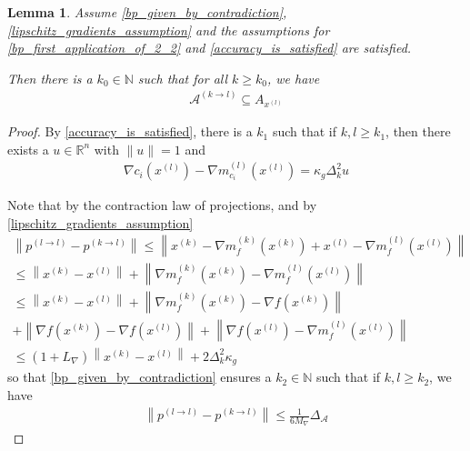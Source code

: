 \documentclass{article}
\newtheorem{lemma}[theorem]{Lemma}
\theoremstyle{case}
\numberwithin{theorem}{subsection}
\newcommand{\dk}{\Delta_k}
\newcommand{\gk}{{\nabla m_f^{(k)}\left(\xk\right)}}
\newcommand{\gmcik}{{\nabla m_{c_i}^{(k)}\left(\xk\right)}}
\newcommand{\lipgrad}{{L_{\nabla}}}
\newcommand{\maxgrad}{{M_{\nabla}}}
\newcommand{\minactivegraddelta}{{\Delta_{\mathcal A}}}
\newcommand{\naturals}{\mathbb N}
\newcommand{\Rn}{\mathbb R^n}
\newcommand{\xk}{x^{(k)}}
\begin{document}
\begin{lemma}
\label{active_models_are_active_p1}
Assume
\cref{bp_given_by_contradiction},
\cref{lipschitz_gradients_assumption}
and the assumptions for 
\cref{bp_first_application_of_2_2}
and \cref{accuracy_is_satisfied}
are satisfied.

Then there is a $k_0 \in \naturals$ such that for all $k \ge k_0$, we have
\begin{align*}
\mathcal A^{(k\to l)} \subseteq A_{x^{(l)}}
\end{align*}
\end{lemma}

\begin{proof}
By \cref{accuracy_is_satisfied}, there is a $k_1$ such that if $k, l \ge k_1$, then there exists a $u \in \Rn$ with $\|u\| = 1$ and 
\begin{align*}
\nabla c_i\left(x^{(l)}\right) - \nabla m_{c_i}^{(l)}\left(x^{(l)}\right) = \kappa_g \dk^2 u
\end{align*}



Note that by the contraction law of projections, and by \cref{lipschitz_gradients_assumption}
\begin{align*}
\left\|p^{(l\to l)} - p^{(k\to l)}\right\| 
\le \left\|\xk - \gk + x^{(l)} - \nabla m_{f}^{(l)}\left(x^{(l)}\right)\right\| \\
\le \left\|\xk - x^{(l)} \right\| + \left\|\gk - \nabla m_{f}^{(l)}\left(x^{(l)}\right)\right\| \\
\le \left\|\xk - x^{(l)} \right\| + \left\|\gk -\nabla f(\xk)\right\| \\
+ \left\|\nabla f\left(\xk\right) - \nabla f\left(x^{(l)}\right)\right\|
+ \left\|\nabla f\left(x^{(l)}\right) - \nabla m_{f}^{(l)}\left(x^{(l)}\right)\right\| \\
\le \left(1 + \lipgrad\right)\left\|\xk - x^{(l)} \right\| + 2 \dk^2 \kappa_g
\end{align*}
so that \cref{bp_given_by_contradiction} ensures a $k_2\in\naturals$ such that if $k, l \ge k_2$, we have
\begin{align}
\left\|p^{(l\to l)} - p^{(k\to l)}\right\| \le \frac 1 {6\maxgrad} \minactivegraddelta \label{bp_aaaaa_p1}
\end{align}



\end{proof}
\end{document}

